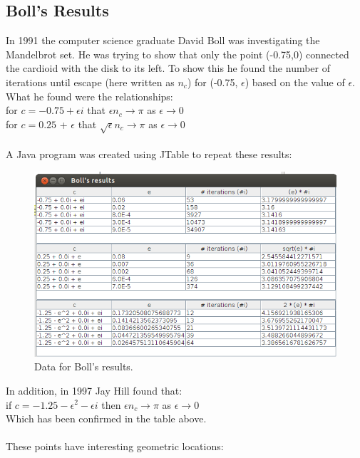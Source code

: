 \documentclass[a4wide, 10pt]{article}
\begin{document}
\subsection{Boll's Results}

In 1991 the computer science graduate David Boll was investigating the Mandelbrot set. He was trying to
 show that only the point (-0.75,0) connected the cardioid with the disk to its left.
To show this he found the number of iterations until escape (here written as $n_{c}$) for (-0.75, $\epsilon$) based on the value of $\epsilon$. What
 he found were the relationships:\\
 
for $c = -0.75 + \epsilon i$ that $\epsilon n_{c} \to \pi$ as $\epsilon \to 0 $
\\for $c = 0.25$ + $\epsilon$ that $ \sqrt{\epsilon}n_{c} \to \pi$ as $\epsilon \to 0 $\\
 \\A Java program was created using JTable to repeat these results:
\begin{figure}[H]
\centering
\includegraphics[scale=0.6]{BollsResults/finalboll.png}
\caption{Data for Boll's results.}
\end{figure}
In addition, in 1997 Jay Hill found that:
\\if $c= -1.25 - {\epsilon}^2 - \epsilon i$ then $\epsilon n_{c}\to \pi$ as $ \epsilon \to 0$\cite{Jay Hill}  \\
Which has been confirmed in the table above.
\\ \\These points have interesting geometric locations:
\end{document}
